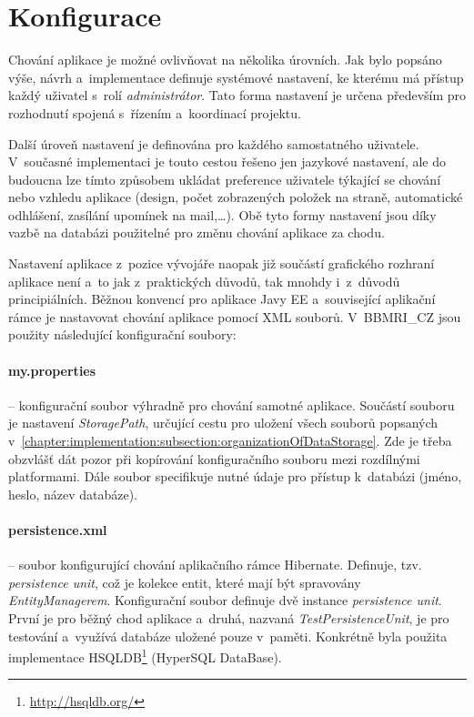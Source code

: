\documentclass[11pt,draft,oneside]{fithesis2}
\newcommand{\ProjectName}{BBMRI\_CZ\xspace}
\begin{document}
\section{Konfigurace}\label{chapter:implementation:section:konfiguration}
Chování aplikace je možné ovlivňovat na několika úrovních. Jak bylo popsáno výše, návrh a~implementace definuje systémové nastavení, ke kterému má přístup každý uživatel s~rolí \textit{administrátor}. Tato forma nastavení je určena především pro rozhodnutí spojená s~řízením a~koordinací projektu. 

Další úroveň nastavení je definována pro každého samostatného uživatele. V~současné implementaci je touto cestou řešeno jen jazykové nastavení, ale do budoucna lze tímto způsobem ukládat preference uživatele týkající se chování nebo vzhledu aplikace (design, počet zobrazených položek na straně, automatické odhlášení, zasílání upomínek na mail,\ldots).
Obě tyto formy nastavení jsou díky vazbě na databázi použitelné pro změnu chování aplikace za chodu. 

Nastavení aplikace z~pozice vývojáře naopak již součástí grafického rozhraní aplikace není a~to jak z~praktických důvodů, tak mnohdy i~z~důvodů principiálních. Běžnou konvencí pro aplikace Javy EE a~související aplikační rámce je nastavovat chování aplikace pomocí XML souborů. V~\ProjectName jsou použity následující konfigurační soubory:

\paragraph*{my.properties} -- konfigurační soubor výhradně pro chování samotné aplikace. Součástí souboru je nastavení \textit{StoragePath}, určující cestu pro uložení všech souborů popsaných v~\ref{chapter:implementation:subsection:organizationOfDataStorage}. Zde je třeba obzvlášť dát pozor při kopírování konfiguračního souboru mezi rozdílnými platformami. 
Dále soubor specifikuje nutné údaje pro přístup k~databázi (jméno, heslo, název databáze).

\paragraph*{persistence.xml} -- soubor konfigurující chování aplikačního rámce Hibernate. Definuje, tzv. \textit{persistence unit}, což je kolekce entit, které mají být spravovány \textit{EntityManagerem}.
Konfigurační soubor definuje dvě instance \textit{persistence unit}. První je pro běžný chod aplikace a~druhá, nazvaná \textit{TestPersistenceUnit}, je pro testování a~využívá databáze uložené pouze v~paměti.
Konkrétně byla použita implementace HSQLDB\footnote{\url{http://hsqldb.org/}} (HyperSQL DataBase).
\end{document}
